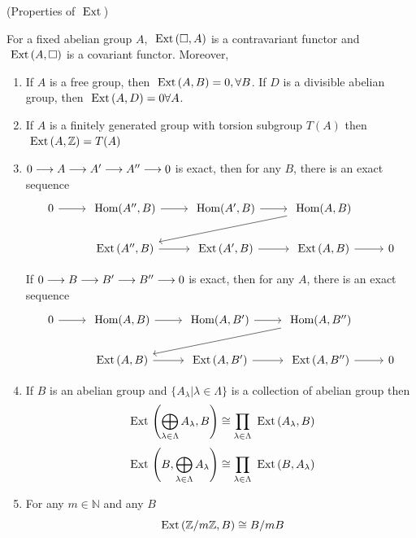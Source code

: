 \documentclass[11pt]{book} %
\begin{document}
\begin{theorem}
(Properties of $\text{ Ext\,}$)

For a fixed abelian group $A$, $\text{ Ext\,}(\square, A)$ is a contravariant functor and $\text{ Ext\,}(A,\square)$ is a covariant functor. Moreover,
\begin{enumerate}[label=(\arabic*)]
\item If $A$ is a free group, then $\text{ Ext\,} (A,B)=0,\forall B$. If $D$ is a divisible abelian group, then $\text{ Ext\,} (A,D)=0\forall A$.
\item If  $A$ is a finitely generated group with torsion subgroup $T(A)$ then $\text{ Ext\,}(A,\mathbb Z)=T(A)$
\item $0\longrightarrow A\longrightarrow A'\longrightarrow A''\longrightarrow 0$ is exact, then for any $B$, there is an exact sequence
$$
\begin{tikzcd}
0 \arrow[r] & \hom(A'',B) \arrow[r] & \hom(A',B) \arrow[r] & \hom(A,B) \arrow[lld] &  \\
 & \ext(A'',B) \arrow[r] & \ext(A',B) \arrow[r] & \ext(A,B) \arrow[r] & 0
\end{tikzcd}
$$


If $0\longrightarrow B\longrightarrow B'\longrightarrow B''\longrightarrow 0$ is exact, then for any $A$, there is an exact sequence
$$
\begin{tikzcd}
0 \arrow[r] & \hom(A,B) \arrow[r] & \hom(A,B') \arrow[r] & \hom(A,B'') \arrow[lld] &  \\
 & \ext(A,B) \arrow[r] & \ext(A,B') \arrow[r] & \ext(A,B'') \arrow[r] & 0
\end{tikzcd}
$$
\item If $B$ is an abelian group and $\{A_\lambda|\lambda\in \Lambda\}$ is a collection of abelian group then 
$$
\text{ Ext\,}\left(\bigoplus_{\lambda\in\Lambda} A_\lambda,B\right)\cong \prod_{\lambda\in \Lambda} \text{ Ext\,}(A_\lambda, B)
$$
$$
\text{ Ext\,}\left(B, \bigoplus_{\lambda\in \Lambda} A_\lambda\right)\cong \prod_{\lambda\in \Lambda} \text{ Ext\,}(B,A_\lambda)
$$
\item For any $m\in \mathbb{N}$ and any $B$
$$
\text{ Ext\,}(\mathbb Z/ m\mathbb Z, B)\cong B/mB
$$
\end{enumerate}
\end{theorem}
\end{document}
